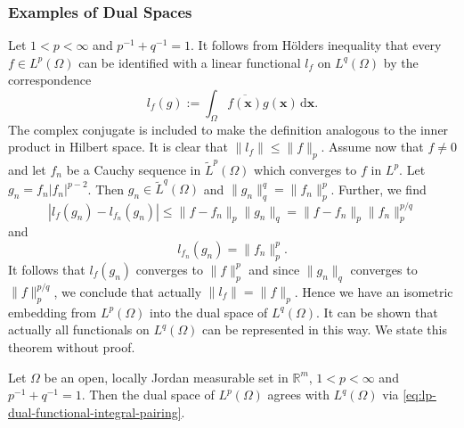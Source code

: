 \subsubsection{Examples of Dual Spaces}\label{subsec:dual-space-examples}

\begin{Example}
\label{ex:lp-conjugate-exponent-dual-functional}
Let $1<p<\infty$ and $p^{-1}+q^{-1}=1$. It follows from Hölder\textquotesingle s inequality that every $f\in L^p(\Omega)$ can be identified with a linear functional $l_f$ on $L^q(\Omega)$ by the correspondence
\begin{equation}\label{eq:lp-dual-functional-integral-pairing}
l_f(g):=\int_\Omega\overline{f(\bm{x})}g(\bm{x})\,\mathrm{d}\bm{x}.
\end{equation}
The complex conjugate is included to make the definition analogous to the inner product in Hilbert space. It is clear that $\|l_f\|\leq\|f\|_p$. Assume now that $f\ne0$ and let $f_n$ be a Cauchy sequence in $\widetilde L^p(\Omega)$ which converges to $f$ in $L^p$. Let $g_n=f_n|f_n|^{p-2}$. Then $g_n\in\widetilde L^q(\Omega)$ and $\|g_n\|_q^q=\|f_n\|_p^p$. Further, we find
\begin{equation}\label{eq:lp-dual-functional-approximating-norm-bound}
|l_f(g_n)-l_{f_n}(g_n)|\leq\|f-f_n\|_p\|g_n\|_q=\|f-f_n\|_p\|f_n\|_p^{p/q}
\end{equation}
and
\begin{equation}\label{eq:lp-dual-functional-approximating-pairing-value}
l_{f_n}(g_n)=\|f_n\|_p^p.
\end{equation}
It follows that $l_f(g_n)$ converges to $\|f\|_p^p$ and since $\|g_n\|_q$ converges to $\|f\|_p^{p/q}$, we conclude that actually $\|l_f\|=\|f\|_p$. Hence we have an isometric embedding from $L^p(\Omega)$ into the dual space of $L^q(\Omega)$. It can be shown that actually all functionals on $L^q(\Omega)$ can be represented in this way. We state this theorem without proof.
\end{Example}

\begin{Theorem}
\label{thm:lp-dual-space-representation}
Let $\Omega$ be an open, locally Jordan measurable set in $\mathbb{R}^m$, $1<p<\infty$ and $p^{-1}+q^{-1}=1$. Then the dual space of $L^p(\Omega)$ agrees with $L^q(\Omega)$ via \eqref{eq:lp-dual-functional-integral-pairing}.
\end{Theorem}

